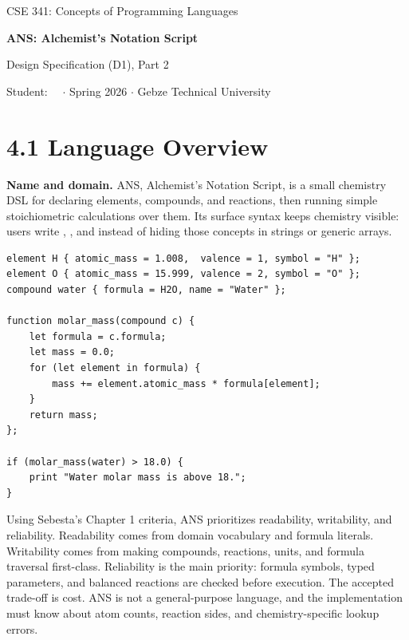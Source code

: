 \begin{center}
  {\footnotesize\color{anscaption}CSE 341: Concepts of Programming Languages\par}
  \vspace{3pt}
  {\huge\bfseries\sffamily ANS: Alchemist's Notation Script\par}
  \vspace{4pt}
  {\large Design Specification (D1), Part 2\par}
  \vspace{5pt}
  {\footnotesize\color{anscaption}Student: \StudentID\ \StudentName\ \(\cdot\) Spring 2026 \(\cdot\) Gebze Technical University\par}
\end{center}

\section{4.1 Language Overview}
\textbf{Name and domain.} ANS, Alchemist's Notation Script, is a small chemistry DSL for declaring elements, compounds, and reactions, then running simple stoichiometric calculations over them. Its surface syntax keeps chemistry visible: users write , , and  instead of hiding those concepts in strings or generic arrays.

\begin{lstlisting}[style=ans]
element H { atomic_mass = 1.008,  valence = 1, symbol = "H" };
element O { atomic_mass = 15.999, valence = 2, symbol = "O" };
compound water { formula = H2O, name = "Water" };

function molar_mass(compound c) {
    let formula = c.formula;
    let mass = 0.0;
    for (let element in formula) {
        mass += element.atomic_mass * formula[element];
    }
    return mass;
};

if (molar_mass(water) > 18.0) {
    print "Water molar mass is above 18.";
}
\end{lstlisting}

Using Sebesta's Chapter 1 criteria, ANS prioritizes readability, writability, and reliability. Readability comes from domain vocabulary and formula literals. Writability comes from making compounds, reactions, units, and formula traversal first-class. Reliability is the main priority: formula symbols, typed parameters, and balanced reactions are checked before execution. The accepted trade-off is cost. ANS is not a general-purpose language, and the implementation must know about atom counts, reaction sides, and chemistry-specific lookup errors.

